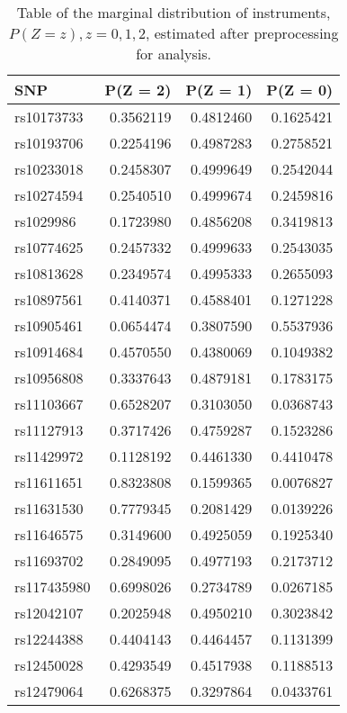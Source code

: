 \documentclass[
]{article}
\theoremstyle{plain}
\begin{document}
\begin{table}[H]
  \caption{Table of the marginal distribution of instruments, $P(Z = z), z=0,1,2$,  estimated after preprocessing for analysis.}
  \label{tab:marginal-distribution-of-instruments-lung-cancer}
  \begin{minipage}{0.5\linewidth}
    \center
    
\begin{tabular}{lrrr}
\toprule
SNP & P(Z = 2) & P(Z = 1) & P(Z = 0)\\
\midrule
rs10173733 & 0.3562119 & 0.4812460 & 0.1625421\\
rs10193706 & 0.2254196 & 0.4987283 & 0.2758521\\
rs10233018 & 0.2458307 & 0.4999649 & 0.2542044\\
rs10274594 & 0.2540510 & 0.4999674 & 0.2459816\\
rs1029986 & 0.1723980 & 0.4856208 & 0.3419813\\
\addlinespace
rs10774625 & 0.2457332 & 0.4999633 & 0.2543035\\
rs10813628 & 0.2349574 & 0.4995333 & 0.2655093\\
rs10897561 & 0.4140371 & 0.4588401 & 0.1271228\\
rs10905461 & 0.0654474 & 0.3807590 & 0.5537936\\
rs10914684 & 0.4570550 & 0.4380069 & 0.1049382\\
\addlinespace
rs10956808 & 0.3337643 & 0.4879181 & 0.1783175\\
rs11103667 & 0.6528207 & 0.3103050 & 0.0368743\\
rs11127913 & 0.3717426 & 0.4759287 & 0.1523286\\
rs11429972 & 0.1128192 & 0.4461330 & 0.4410478\\
rs11611651 & 0.8323808 & 0.1599365 & 0.0076827\\
\addlinespace
rs11631530 & 0.7779345 & 0.2081429 & 0.0139226\\
rs11646575 & 0.3149600 & 0.4925059 & 0.1925340\\
rs11693702 & 0.2849095 & 0.4977193 & 0.2173712\\
rs117435980 & 0.6998026 & 0.2734789 & 0.0267185\\
rs12042107 & 0.2025948 & 0.4950210 & 0.3023842\\
\addlinespace
rs12244388 & 0.4404143 & 0.4464457 & 0.1131399\\
rs12450028 & 0.4293549 & 0.4517938 & 0.1188513\\
rs12479064 & 0.6268375 & 0.3297864 & 0.0433761\\

\end{tabular}
\end{minipage}
\end{table}
\end{document}
